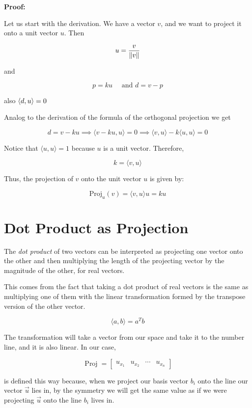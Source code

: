 \textbf{Proof:}

Let us start with the derivation. We have a vector \(v\), and we want to project it onto a unit vector \(u\). Then

\[
	u = \frac{v}{\left\| v \right\|}
\]

and 

\[
	p = k u \quad \text{ and } d = v - p
\]

also \(\left\langle d, u\right\rangle = 0\)

Analog to the derivation of the formula of the orthogonal projection we get 

\[
	d = v - k u \implies \langle v - k u, u\rangle = 0 \implies \langle v, u\rangle - k \langle u, u\rangle = 0
\]

Notice that \(\langle u, u\rangle = 1\) because \(u\) is a unit vector. Therefore, 

\[
	k = \langle v, u\rangle
\]

Thus, the projection of \(v\) onto the unit vector \(u\) is given by:

\[
	\text{Proj}_{u}(v) = \langle v, u\rangle u = k u
\]

\QED

\section{Dot Product as Projection}

The \emph{dot product} of two vectors can be interpreted as projecting one vector onto the other and then multiplying the 
length of the projecting vector by the magnitude of the other, for real vectors.

This comes from the fact that taking a dot product of real vectors is the same as 
multiplying one of them with the linear transformation formed by the transpose version of the other vector. 

\[
	\langle a, b\rangle = a^T b
\]

The transformation will take a vector from our space and take it to the number line, and it is also 
linear. In our case,

\[
    \operatorname{Proj} =
    \begin{bmatrix}
        u_{x_1} & u_{x_2} & \cdots & u_{x_n} 
    \end{bmatrix}
\]

is defined this way because, when we project our basis vector \(b_i\) onto the line our vector \(\vec{u}\) lies in, 
by the symmetry we will get the same value as if we were projecting \(\vec{u}\) onto 
the line \(b_i\) lives in.

